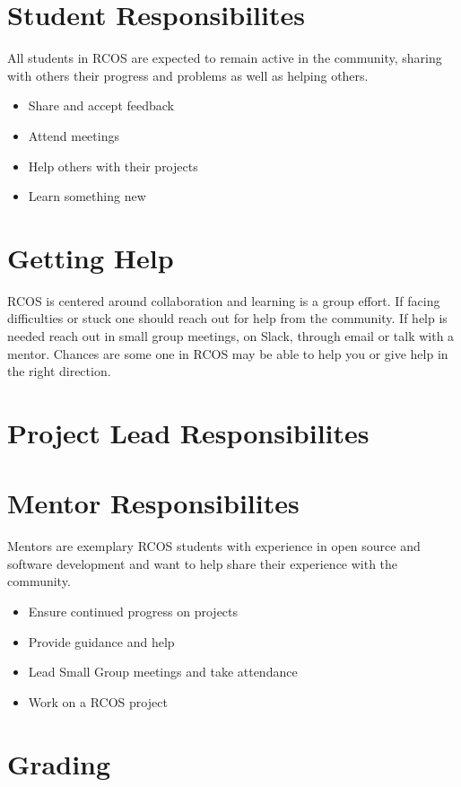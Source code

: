 \documentclass[12pt]{article}
\begin{document}

    \section{Student Responsibilites}

    All students in RCOS are expected to remain active in the community, sharing with others their progress and problems as well as helping others.

    \begin{itemize}
        \item Share and accept feedback
        \item Attend meetings
        \item Help others with their projects
        \item Learn something new
    \end{itemize}

    \section{Getting Help}

    RCOS is centered around collaboration and learning is a group effort. If facing difficulties or stuck one should reach out for help from the community. If help is needed reach out in small group meetings, on Slack, through email or talk with a mentor. Chances are some one in RCOS may be able to help you or give help in the right direction.

    \section{Project Lead Responsibilites}


    \section{Mentor Responsibilites}

    Mentors are exemplary RCOS students with experience in open source and software development and want to help share their experience with the community.

    \begin{itemize}
        \item Ensure continued progress on projects
        \item Provide guidance and help
        \item Lead Small Group meetings and take attendance
        \item Work on a RCOS project
    \end{itemize}

    \section{Grading}

\end{document}
